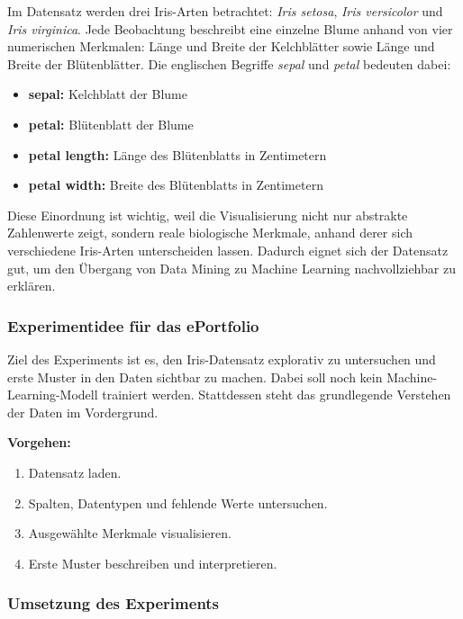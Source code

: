 \documentclass[12pt,a4paper]{article}
\begin{document}
Im Datensatz werden drei Iris-Arten betrachtet: \textit{Iris setosa}, \textit{Iris versicolor} und \textit{Iris virginica}. Jede Beobachtung beschreibt eine einzelne Blume anhand von vier numerischen Merkmalen: Länge und Breite der Kelchblätter sowie Länge und Breite der Blütenblätter. Die englischen Begriffe \textit{sepal} und \textit{petal} bedeuten dabei:

\begin{itemize}
\item \textbf{sepal:} Kelchblatt der Blume
\item \textbf{petal:} Blütenblatt der Blume
\item \textbf{petal length:} Länge des Blütenblatts in Zentimetern
\item \textbf{petal width:} Breite des Blütenblatts in Zentimetern
\end{itemize}

Diese Einordnung ist wichtig, weil die Visualisierung nicht nur abstrakte Zahlenwerte zeigt, sondern reale biologische Merkmale, anhand derer sich verschiedene Iris-Arten unterscheiden lassen. Dadurch eignet sich der Datensatz gut, um den Übergang von Data Mining zu Machine Learning nachvollziehbar zu erklären.

\subsubsection*{Experimentidee für das ePortfolio}

Ziel des Experiments ist es, den Iris-Datensatz explorativ zu untersuchen und erste Muster in den Daten sichtbar zu machen. Dabei soll noch kein Machine-Learning-Modell trainiert werden. Stattdessen steht das grundlegende Verstehen der Daten im Vordergrund.

\textbf{Vorgehen:}

\begin{enumerate}
\item Datensatz laden.
\item Spalten, Datentypen und fehlende Werte untersuchen.
\item Ausgewählte Merkmale visualisieren.
\item Erste Muster beschreiben und interpretieren.
\end{enumerate}

\subsubsection*{Umsetzung des Experiments}
\end{document}
